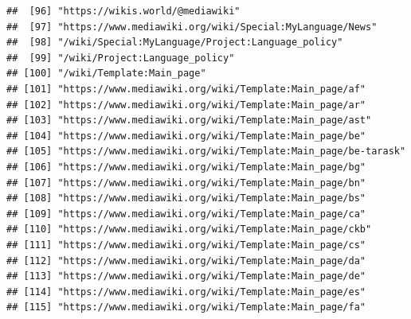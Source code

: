 \documentclass[
]{article}
\begin{document}
\begin{verbatim}
##  [96] "https://wikis.world/@mediawiki"                                                                                              
##  [97] "https://www.mediawiki.org/wiki/Special:MyLanguage/News"                                                                      
##  [98] "/wiki/Special:MyLanguage/Project:Language_policy"                                                                            
##  [99] "/wiki/Project:Language_policy"                                                                                               
## [100] "/wiki/Template:Main_page"                                                                                                    
## [101] "https://www.mediawiki.org/wiki/Template:Main_page/af"                                                                        
## [102] "https://www.mediawiki.org/wiki/Template:Main_page/ar"                                                                        
## [103] "https://www.mediawiki.org/wiki/Template:Main_page/ast"                                                                       
## [104] "https://www.mediawiki.org/wiki/Template:Main_page/be"                                                                        
## [105] "https://www.mediawiki.org/wiki/Template:Main_page/be-tarask"                                                                 
## [106] "https://www.mediawiki.org/wiki/Template:Main_page/bg"                                                                        
## [107] "https://www.mediawiki.org/wiki/Template:Main_page/bn"                                                                        
## [108] "https://www.mediawiki.org/wiki/Template:Main_page/bs"                                                                        
## [109] "https://www.mediawiki.org/wiki/Template:Main_page/ca"                                                                        
## [110] "https://www.mediawiki.org/wiki/Template:Main_page/ckb"                                                                       
## [111] "https://www.mediawiki.org/wiki/Template:Main_page/cs"                                                                        
## [112] "https://www.mediawiki.org/wiki/Template:Main_page/da"                                                                        
## [113] "https://www.mediawiki.org/wiki/Template:Main_page/de"                                                                        
## [114] "https://www.mediawiki.org/wiki/Template:Main_page/es"                                                                        
## [115] "https://www.mediawiki.org/wiki/Template:Main_page/fa"                                                                        

\end{verbatim}
\end{document}
